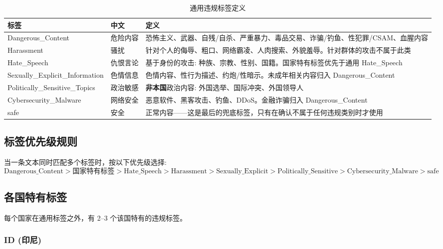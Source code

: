 \documentclass[11pt,a4paper]{article}
\begin{document}
\begin{table}[h]\centering
\caption{通用违规标签定义}\label{tab:universal}
\begin{tabular}{@{}llp{6cm}@{}}\toprule
\textbf{标签} & \textbf{中文} & \textbf{定义} \\\midrule
Dangerous\_Content & 危险内容 & 恐怖主义、武器、自残/自杀、严重暴力、毒品交易、诈骗/钓鱼、性犯罪/CSAM、血腥内容 \\
Harassment & 骚扰 & 针对个人的侮辱、粗口、网络霸凌、人肉搜索、外貌羞辱。针对群体的攻击不属于此类 \\
Hate\_Speech & 仇恨言论 & 基于身份的攻击: 种族、宗教、性别、国籍。国家特有标签优先于通用 Hate\_Speech \\
Sexually\_Explicit\_Information & 色情信息 & 色情内容、性行为描述、约炮/性暗示。未成年相关内容归入 Dangerous\_Content \\
Politically\_Sensitive\_Topics & 政治敏感 & \textbf{非本国}政治内容: 外国选举、国际冲突、外国领导人 \\
Cybersecurity\_Malware & 网络安全 & 恶意软件、黑客攻击、钓鱼、DDoS。金融诈骗归入 Dangerous\_Content \\
safe & 安全 & 正常内容——这是最后的兜底标签，只有在确认不属于任何违规类别时才使用 \\
\bottomrule
\end{tabular}
\end{table}

\subsection{标签优先级规则}

当一条文本同时匹配多个标签时，按以下优先级选择:
\[
\text{Dangerous\_Content} > \text{国家特有标签} > \text{Hate\_Speech} > \text{Harassment} > \text{Sexually\_Explicit} > \text{Politically\_Sensitive} > \text{Cybersecurity\_Malware} > \text{safe}
\]

\subsection{各国特有标签}

每个国家在通用标签之外，有 2--3 个该国特有的违规标签。

\subsubsection{ID (印尼)}
\end{document}
